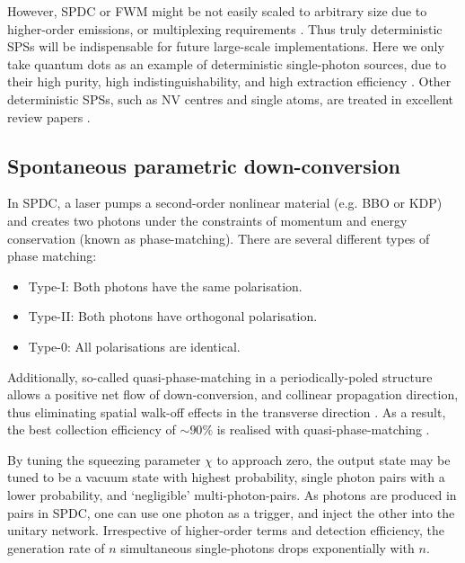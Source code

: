 \documentclass[aps,rmp,twocolumn,amsmath,amssymb,nofootinbib,superscriptaddress]{revtex4}
\newcommand{\comment}[1]{{\color{blue}{#1}}}
\begin{document}
However, SPDC or FWM might be not easily scaled to arbitrary size due to higher-order emissions, or multiplexing requirements \cite{bib:MotesScal}. Thus truly deterministic SPSs will be indispensable for future large-scale implementations. Here we only take quantum dots as an example of deterministic single-photon sources, due to their high purity, high indistinguishability, and high extraction efficiency \cite{bib:47, bib:48, bib:49, bib:50, bib:51, bib:52}. Other deterministic SPSs, such as NV centres and single atoms, are treated in excellent review papers \cite{bib:53}.

\subsection{Spontaneous parametric down-conversion}

In SPDC, a laser pumps a second-order nonlinear material (e.g. BBO or KDP) and creates two photons under the constraints of momentum and energy conservation (known as phase-matching). There are several different types of phase matching:
\begin{itemize}
\item Type-I: Both photons have the same polarisation.
\item Type-II: Both photons have orthogonal polarisation.
\item Type-0: All polarisations are identical. \comment{How is this different to type-I?}
\end{itemize}
Additionally, so-called quasi-phase-matching in a periodically-poled structure allows a positive net flow of down-conversion, and collinear propagation direction, thus eliminating spatial walk-off effects in the transverse direction \comment{Maybe we could explain what this means? I'm a theorist and I don't know these terms :)}. As a result, the best collection efficiency of \mbox{$\sim 90\%$} is realised with quasi-phase-matching \cite{bib:41, bib:42}.

By tuning the squeezing parameter $\chi$ to approach zero, the output state may be tuned to be a vacuum state with highest probability, single photon pairs with a lower probability, and `negligible' multi-photon-pairs. As photons are produced in pairs in SPDC, one can use one photon as a trigger, and inject the other into the unitary network. Irrespective of higher-order terms and detection efficiency, the generation rate of $n$ simultaneous single-photons drops exponentially with $n$.
\end{document}
